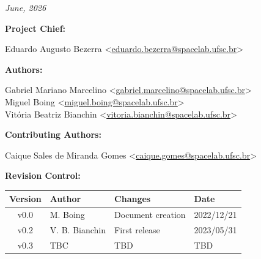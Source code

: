 %
%
%
%
%

%
%
%
%
%

\thispagestyle{empty}

\begin{center}

\textbf{\thetitle}

\textit{June, 2026}

\vspace{1cm}

\textbf{Project Chief:}

Eduardo Augusto Bezerra <\href{mailto:eduardo.bezerra@spacelab.ufsc.br}{eduardo.bezerra@spacelab.ufsc.br}>

\vspace{1cm}

\textbf{Authors:}

Gabriel Mariano Marcelino <\href{mailto:gabriel.marcelino@spacelab.ufsc.br}{gabriel.marcelino@spacelab.ufsc.br}> \\
Miguel Boing <\href{mailto:miguel.boing@spacelab.ufsc.br}{miguel.boing@spacelab.ufsc.br}> \\
Vitória Beatriz Bianchin
<\href{mailto:vitoria.bianchin@spacelab.ufsc.br}{vitoria.bianchin@spacelab.ufsc.br}> \\

\vspace{1cm}

\textbf{Contributing Authors:}

Caique Sales de Miranda Gomes <\href{mailto:caique.gomes@spacelab.ufsc.br}{caique.gomes@spacelab.ufsc.br}> \\

\vspace{1cm}

\textbf{Revision Control:}

\end{center}

\begin{table}[!ht]
    \begin{center}
        \begin{tabular}{cL{5cm}L{5.5cm}C{2cm}}
            \toprule[1.5pt]
            \textbf{Version} & \textbf{Author}  & \textbf{Changes}    & \textbf{Date} \\
            \midrule
            v0.0 & M. Boing       & Document creation & 2022/12/21 \\
            v0.2 & V. B. Bianchin & First release     & 2023/05/31 \\
            v0.3 & TBC            & TBD               & TBD \\
            \bottomrule[1.5pt]
        \end{tabular}
    \end{center}
\end{table}

